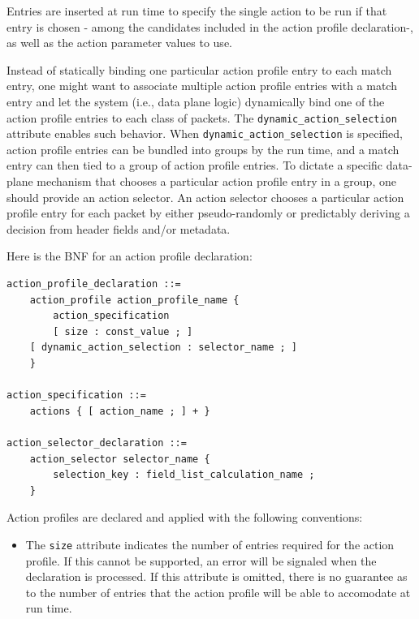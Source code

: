 \documentclass[12pt]{article}
\begin{document}
Entries are inserted at run time to specify the single action to be run if that
entry is chosen - among the candidates included in the action profile
declaration-, as well as the action parameter values to use.

Instead of statically binding one particular action profile entry to each match
entry, one might want to associate multiple action profile entries with a match
entry and let the system (i.e., data plane logic) dynamically bind one of the
action profile entries to each class of packets. The
\texttt{dynamic_action_selection} attribute enables such behavior. When
\texttt{dynamic_action_selection} is specified, action profile entries can be
bundled into groups by the run time, and a match entry can then tied to a group
of action profile entries. To dictate a specific data-plane mechanism that
chooses a particular action profile entry in a group, one should provide an
action selector. An action selector chooses a particular action profile entry
for each packet by either pseudo-randomly or predictably deriving a decision
from header fields and/or metadata.

Here is the BNF for an action profile declaration:

\begin{lstlisting}[style=BNFstyle]
action_profile_declaration ::=
    action_profile action_profile_name {
        action_specification
        [ size : const_value ; ]
	[ dynamic_action_selection : selector_name ; ]
    }

action_specification ::= 
    actions { [ action_name ; ] + }

action_selector_declaration ::=
    action_selector selector_name {
        selection_key : field_list_calculation_name ;
    }
\end{lstlisting}

Action profiles are declared and applied with the following conventions:

\begin{itemize}
\item
The \texttt{size} attribute indicates the number of entries required for the
action profile. If this cannot be supported, an error will be signaled when the
declaration is processed. If this attribute is omitted, there is no guarantee as
to the number of entries that the action profile will be able to accomodate at
run time.
\end{itemize}


\end{document}
